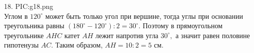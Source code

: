 18. {{PIC:g18.png}}\\
Углом в $120^\circ$ может быть только угол при вершине, тогда углы при основании треугольника равны $(180^\circ-120^\circ):2=30^\circ.$ Поэтому в прямоугольном треугольнике $AHC$ катет $AH$ лежит напротив угла $30^\circ,$ а значит равен половине гипотенузы $AC.$ Таким образом, $AH=10:2=5$ см.\\
